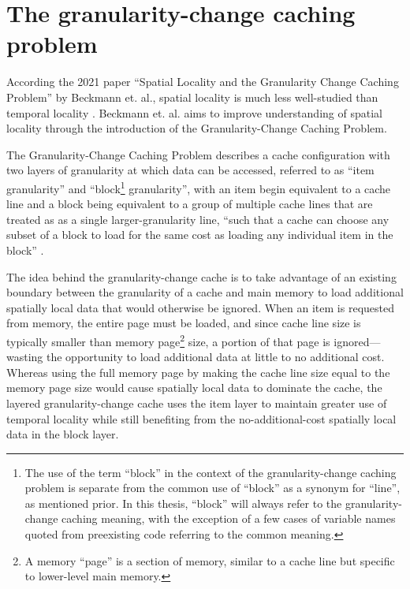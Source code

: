\documentclass[12pt,twoside]{reedthesis}
\begin{document}


\section{The granularity-change caching problem}

According the 2021 paper ``Spatial Locality and the Granularity Change Caching Problem'' by Beckmann et. al., spatial locality is much less well-studied than temporal locality  \cite{beckmann}. Beckmann et. al. aims to improve understanding of spatial locality through the introduction of the Granularity-Change Caching Problem.

The Granularity-Change Caching Problem describes a cache configuration with two layers of granularity at which data can be accessed, referred to as ``item granularity'' and ``block\footnote{The use of the term ``block'' in the context of the granularity-change caching problem is separate from the common use of ``block'' as a synonym for ``line'', as mentioned prior. In this thesis, ``block'' will always refer to the granularity-change caching meaning, with the exception of a few cases of variable names quoted from preexisting code referring to the common meaning.} granularity'', with an item begin equivalent to a cache line and a block being equivalent to a group of multiple cache lines that are treated as as a single larger-granularity line, ``such that a cache can choose any subset of a block to load for the same cost as loading any individual item in the block'' \cite{beckmann}.

The idea behind the granularity-change cache is to take advantage of an existing boundary between the granularity of a cache and main memory to load additional spatially local data that would otherwise be ignored. When an item is requested from memory, the entire page must be loaded, and since cache line size is typically smaller than memory page\footnote{A memory ``page'' is a section of memory, similar to a cache line but specific to lower-level main memory.} size, a portion of that page is ignored---wasting the opportunity to load additional data at little to no additional cost. Whereas using the full memory page by making the cache line size equal to the memory page size would cause spatially local data to dominate the cache, the layered granularity-change cache uses the item layer to maintain greater use of temporal locality while still benefiting from the no-additional-cost spatially local data in the block layer.
\end{document}

